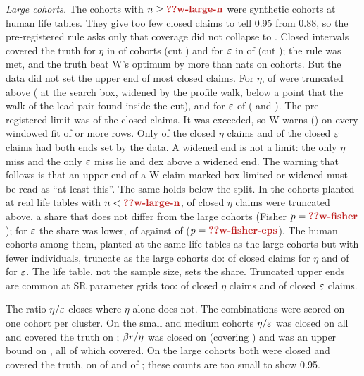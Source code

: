 \emph{Large cohorts.} The  cohorts with $n\ge\C{w-large-n}$ were synthetic cohorts at human life tables. They give
too few closed claims to tell 0.95 from 0.88, so the pre-registered rule asks only that coverage did not collapse to
. Closed intervals covered the truth for $\eta$ in  of  cohorts (cut
) and for $\varepsilon$ in  of  (cut ); the rule was met, and the
truth beat W's optimum by more than  nats on  cohorts. But the data did not set the upper end
of most closed claims. For $\eta$,  of  were truncated above ( at the search
box,  widened by the profile walk,  below a point that the walk of the lead pair found inside
the cut), and for $\varepsilon$  of  ( and ). The pre-registered limit
was  of the closed claims. It was exceeded, so W warns () on every windowed fit of
 or more rows. Only  of the  closed $\eta$ claims and  of the
 closed $\varepsilon$ claims had both ends set by the data. A widened end is not a limit: the only
$\eta$ miss and the only $\varepsilon$ miss lie  and  dex above a widened end. The warning that
follows is that an upper end of a W claim marked box-limited or widened must be read as ``at least this''. The same holds
below the split. In the cohorts planted at real life tables with $n<\C{w-large-n}$,  of
 closed $\eta$ claims were truncated above, a share that does not differ from the large cohorts (Fisher
$p=\C{w-fisher}$); for $\varepsilon$ the share was lower,  of  against  of
 ($p=\C{w-fisher-eps}$). The  human cohorts among them, planted at the same life tables as the
large cohorts but with fewer individuals, truncate as the large cohorts do:  of  closed
claims for $\eta$ and  of  for $\varepsilon$. The life table, not the sample size, sets the
share. Truncated upper ends are common at SR parameter grids too:  of  closed
$\eta$ claims and  of  closed $\varepsilon$ claims.

The ratio $\eta/\varepsilon$ closes where $\eta$ alone does not. The combinations were scored on one cohort per cluster. On the small
and medium cohorts $\eta/\varepsilon$ was closed on all  and covered the truth on ;
$\beta\bar r/\eta$ was closed on  (covering ) and was an upper bound on
, all of which covered. On the large cohorts both were closed and covered the truth, on
 of  and  of ; these counts are too small to
show 0.95.

